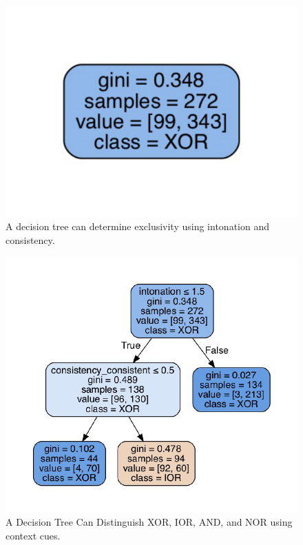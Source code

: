 \documentclass[,man,floatsintext]{apa6}
\begin{document}
\begin{figure}
\centering
\includegraphics{figs/binaryBaseline-1.pdf}
\caption{\label{fig:binaryBaseline}A decision tree can determine exclusivity using intonation and consistency.}
\end{figure}

\begin{figure}
\centering
\includegraphics{figs/binaryCueBased-1.pdf}
\caption{\label{fig:binaryCueBased}A Decision Tree Can Distinguish XOR, IOR, AND, and NOR using context cues.}
\end{figure}
\end{document}
